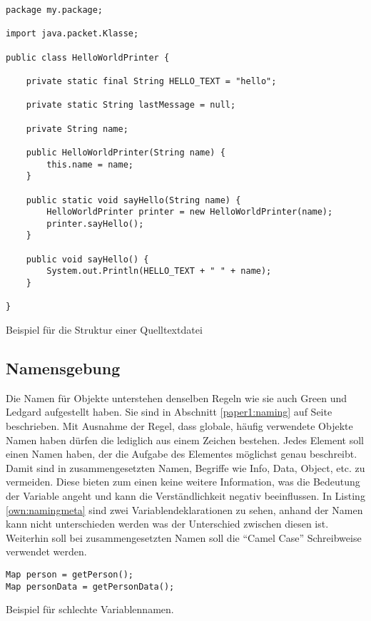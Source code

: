 \begin{listing}[H]
    \begin{verbatim}
package my.package;

import java.packet.Klasse;

public class HelloWorldPrinter {
    
    private static final String HELLO_TEXT = "hello";

    private static String lastMessage = null;

    private String name;

    public HelloWorldPrinter(String name) {
        this.name = name;
    }

    public static void sayHello(String name) {
        HelloWorldPrinter printer = new HelloWorldPrinter(name);
        printer.sayHello();
    }

    public void sayHello() {
        System.out.Println(HELLO_TEXT + " " + name);
    }

}
    \end{verbatim}
    \caption{Beispiel für die Struktur einer Quelltextdatei}
    \label{own:struct}
\end{listing}

\subsection{Namensgebung}
Die Namen für Objekte unterstehen denselben Regeln wie sie auch Green und Ledgard aufgestellt haben. Sie sind in Abschnitt \ref{paper1:naming} auf Seite \pageref{paper1:naming} beschrieben. Mit Ausnahme der Regel, dass globale, häufig verwendete Objekte Namen haben dürfen die lediglich aus einem Zeichen bestehen. Jedes Element soll einen Namen haben, der die Aufgabe des Elementes möglichst genau beschreibt. Damit sind in zusammengesetzten Namen, Begriffe wie Info, Data, Object, etc. zu vermeiden. Diese bieten zum einen keine weitere Information,  was die Bedeutung der Variable angeht und kann die Verständlichkeit negativ beeinflussen. In Listing \ref{own:namingmeta} sind zwei Variablendeklarationen zu sehen, anhand der Namen kann nicht unterschieden werden was der Unterschied zwischen diesen ist. Weiterhin soll bei zusammengesetzten Namen soll die \enquote{Camel Case} Schreibweise verwendet werden.

\begin{listing}[H]
    \begin{verbatim}
Map person = getPerson();
Map personData = getPersonData();
    \end{verbatim}
    \caption{Beispiel für schlechte Variablennamen.}
    \label{own:namingmeta}
\end{listing}


